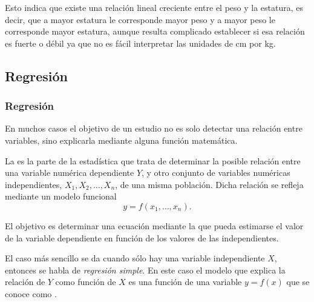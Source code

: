 \begin{frame}
{Esto indica que existe una relación lineal creciente entre el peso y la estatura, es decir, que a mayor estatura le corresponde mayor peso
y a mayor peso le corresponde mayor estatura, aunque resulta complicado establecer si esa relación es fuerte o débil ya que no es fácil
interpretar las unidades de cm por kg.}
\end{frame}


\subsection{Regresión}
\begin{frame}
\frametitle{Regresión}
En muchos casos el objetivo de un estudio no es solo detectar una relación entre variables, sino explicarla mediante
alguna función matemática.

La  es la parte de la estadística que trata de determinar la posible relación entre una variable numérica
dependiente $Y$, y otro conjunto de variables numéricas independientes, $X_1,X_2,\ldots,X_n$, de una misma población. Dicha relación se
refleja mediante un modelo funcional 
\[ y=f(x_1,\ldots,x_n). \]

El objetivo es determinar una ecuación mediante la que pueda estimarse el valor de la variable dependiente en función de los valores de las independientes.

El caso más sencillo se da cuando sólo hay una variable independiente $X$, entonces se habla de \emph{regresión
simple}. En este caso el modelo que explica la relación de $Y$ como función de $X$ es una función de una variable
$y=f(x)$ que se conoce como .

\end{frame}


